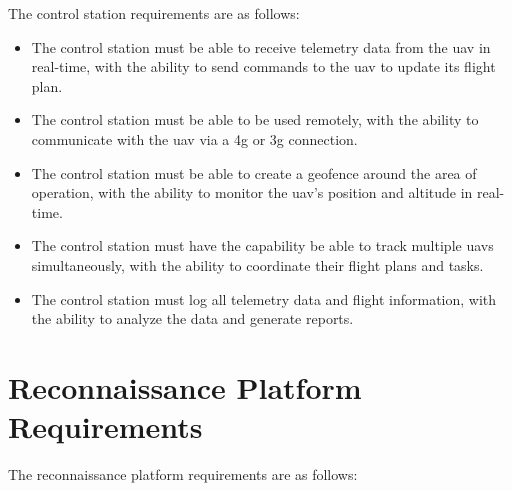 The control station requirements are as follows:


\begin{itemize}
  \item The control station must be able to receive telemetry data from the \gls{uav} in real-time, with the ability to send commands to the \gls{uav} to update its flight plan.

  \item The control station must be able to be used remotely, with the ability to communicate with the \gls{uav} via a \gls{4g} or \gls{3g} connection.

  \item The control station must be able to create a geofence around the area of operation, with the ability to monitor the \gls{uav}'s position and altitude in real-time.

  \item The control station must have the capability be able to track multiple \glspl{uav} simultaneously, with the ability to coordinate their flight plans and tasks.

  \item The control station must log all telemetry data and flight information, with the ability to analyze the data and generate reports.
\end{itemize}

\section{Reconnaissance Platform Requirements}

The reconnaissance platform requirements are as follows:

